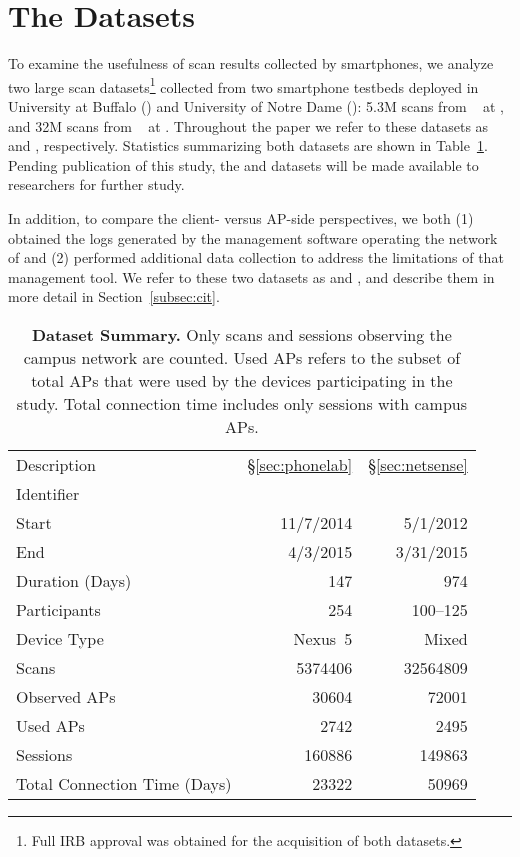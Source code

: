 \section{The Datasets}
\label{sec:dataset}

To examine the usefulness of \wifi{} scan results collected by smartphones, we
analyze two large scan datasets\footnote{Full IRB approval was obtained for the
acquisition of both datasets.} collected from two smartphone testbeds deployed
in University at Buffalo (\ub{}) and University of Notre Dame (\nd{}): 5.3M scans from
\PhoneLab{}~\cite{nandugudi2013phonelab} at \ub{}, and 32M scans from
\NetSense{}~\cite{striegel2013lessons} at \nd{}.  Throughout the paper we refer
to these datasets as \textbf{\ubscan{}} and \textbf{\ndscan{}}, respectively.
Statistics summarizing both datasets are shown in Table~\ref{tab:stats}. Pending
publication of this study, the \ubscan{} and \ndscan{} datasets will be made
available to researchers for further study.

In addition, to compare the client- versus AP-side perspectives, we
both (1) obtained the logs generated by the management software
operating the \wifi{} network of \ub{} and (2) performed additional data collection
to address the limitations of that management tool. We refer to these two
datasets as \textbf{\ubap{}} and \textbf{\ubapdetail{}}, and describe them in
more detail in Section~\ref{subsec:cit}.

\begin{table}[t]
  {\small
  \begin{tabularx}{\columnwidth}{Xrr}
    & \PhoneLab{} & \NetSense{}\\\midrule
    Description & \S\ref{sec:phonelab} & \S\ref{sec:netsense} \\
    Identifier & \ubscan{} & \ndscan{} \\ 
    Start & 11/7/2014 & 5/1/2012 \\ 
    End & 4/3/2015 & 3/31/2015 \\ 
    Duration (Days) & 147 & 974 \\ \midrule
    Participants & 254 & 100--125 \\
    Device Type & Nexus~5 & Mixed \\ \midrule
    Scans & \num{5374406} & \num{32564809} \\
    Observed APs & \num{30604} & \num{72001} \\
    Used APs & \num{2742} & \num{2495}\\ \midrule
    \wifi{} Sessions & \num{160886} & \num{149863} \\
    Total Connection Time (Days) & \num{23322} & \num{50969} 
  \end{tabularx}
  \caption{\textbf{Dataset Summary.} Only \wifi{} scans and sessions
  observing the campus network are counted. Used APs refers to the subset of
  total APs that were used by the devices participating in the study. Total
connection time includes only \wifi{} sessions with campus APs.}
  \label{tab:stats}
  \vspace*{-5mm}
}
\end{table}


